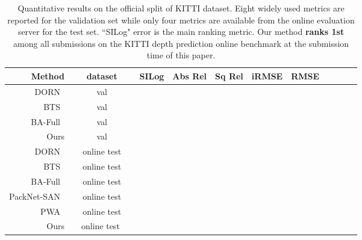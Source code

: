 \documentclass[10pt,twocolumn,letterpaper]{article}
\begin{document}
\setlength{\tabcolsep}{3pt}
\begin{table*}[]
\small
\centering
\begin{tabular}{r c c c c c c c c c c}
\toprule
Method & dataset & SILog  & Abs Rel  & Sq Rel  & iRMSE  & RMSE  &   &   &   \\
\midrule
DORN~\cite{fu2018deep} & val  &  &  &  &  &  &  &  & \\
BTS~\cite{lee2019big} & val &  &  &  &  &  &  &  & \\
BA-Full~\cite{aich2020bidirectional} & val &  &  &  &  &  &  &  & \\
Ours & val &  &  &  &  &  &  &  & \\
\midrule
DORN~\cite{fu2018deep} & online test &  &  &  &  &  &  &  & \\
BTS~\cite{lee2019big} & online test  &  &  &  &  &  &  &  & \\
BA-Full~\cite{aich2020bidirectional} & online test  &  &  &  &  &  &  &  & \\
PackNet-SAN~\cite{guizilini2021sparse} & online test &  &  &  &  &  &  &  & \\
PWA~\cite{lee2021patch} & online test &  &  &  &  &  &  &  & \\
Ours & \ \ online test \ \  &  &  &  &  &  &  &  & \\

\bottomrule
\end{tabular}
\vspace{-2mm}
\caption{Quantitative results on the official split of KITTI dataset. Eight widely used metrics are reported for the validation set while only four metrics are available from the online evaluation server for the test set. ``SILog" error is the main ranking metric. Our method \textbf{ranks 1st} among all submissions on the KITTI depth prediction online benchmark at the submission time of this paper.}
\label{tab:kitti_official}
\vspace{-5mm}
\end{table*}
\setlength{\tabcolsep}{3pt}
\end{document}
